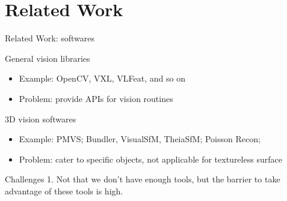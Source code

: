 \documentclass[10pt]{beamer}
\begin{document}
\section{Related Work}
\begin{frame}{Related Work: softwares}


\begin{exampleblock}{General vision libraries}
\begin{itemize}
  \item Example: OpenCV, VXL, VLFeat, and so on
  \item Problem: provide APIs for vision routines
\end{itemize}
\end{exampleblock}

\begin{exampleblock}{3D vision softwares}
  \begin{itemize}
    \item Example: PMVS; Bundler, VisualSfM, TheiaSfM; Poisson Recon;
    \item Problem: cater to specific objects, not applicable for textureless surface
  \end{itemize}
\end{exampleblock}

\begin{alertblock}{Challenges}
1. Not that we don't have enough tools, but the barrier to take advantage of these tools is high. \\
\end{alertblock}

\end{frame}
\end{document}
